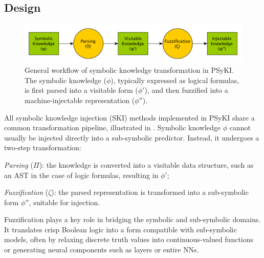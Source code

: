 \subsection{Design}\label{subsec:design-and-implementation}
%
\begin{figure}
    \centering
    \includegraphics[width=\textwidth]{figures/knowledge-workflow-psyki}
    \caption[Symbolic knowledge transformation in PSyKI]{
        General workflow of symbolic knowledge transformation in \Gls{PSyKI}.
        The symbolic knowledge ($\phi$), typically expressed as logical formulas, is first parsed into a visitable form ($\phi'$), and then fuzzified into a machine-injectable representation ($\phi''$).
    }
    \label{fig:knowledge-workflow-psyki}
\end{figure}
%
All symbolic knowledge injection (\gls{SKI}) methods implemented in \gls{PSyKI} share a common transformation pipeline, illustrated in .
%
Symbolic knowledge \(\phi\) cannot usually be injected directly into a sub-symbolic predictor.
%
Instead, it undergoes a two-step transformation:
%
\begin{inlinelist}
    \item \emph{Parsing} (\(\Pi\)): the knowledge is converted into a visitable data structure, such as an \gls{AST} in the case of logic formulas, resulting in \(\phi'\);
    \item \emph{Fuzzification} (\(\zeta\)): the parsed representation is transformed into a sub-symbolic form \(\phi''\), suitable for injection.
\end{inlinelist}
%
Fuzzification plays a key role in bridging the symbolic and sub-symbolic domains.
%
It translates crisp Boolean logic into a form compatible with sub-symbolic models, often by relaxing discrete truth values into continuous-valued functions or generating neural components such as layers or entire \glspl{NN}.


